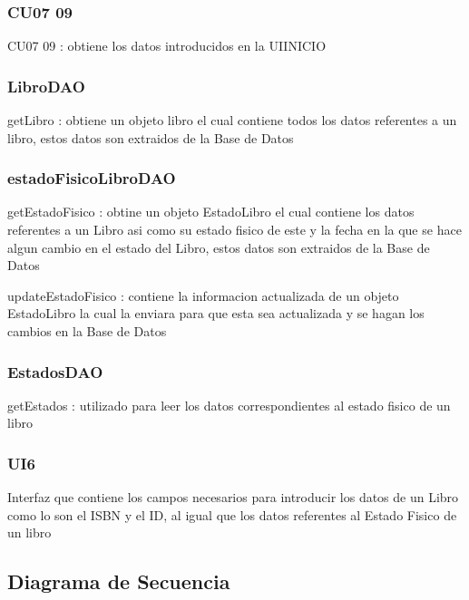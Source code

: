\subsubsection{CU07 09}
	\begin{Citemize}
		\item CU07 09 : obtiene los datos introducidos en la UIINICIO
	\end{Citemize}

\subsubsection{LibroDAO}
	\begin{Citemize}
		\item getLibro : obtiene un objeto libro el cual contiene todos los datos referentes a un libro, estos datos son extraidos de la Base de Datos
	\end{Citemize}
	
\subsubsection{estadoFisicoLibroDAO}
	\begin{Citemize}
		\item getEstadoFisico : obtine un objeto EstadoLibro el cual contiene los datos referentes a un Libro asi como su estado fisico de este y la fecha en la que se hace algun cambio en el estado del Libro, estos datos son extraidos de la Base de Datos
		\item updateEstadoFisico : contiene la informacion actualizada de un objeto EstadoLibro la cual la enviara para que esta sea actualizada y se hagan los cambios en la Base de Datos
	\end{Citemize}

\subsubsection{EstadosDAO}
	\begin{Citemize}
		\item getEstados : utilizado para leer los datos correspondientes al estado fisico de un libro
	\end{Citemize}
	
\subsubsection{UI6}
	\begin{Citemize}
		\item Interfaz que contiene los campos necesarios para introducir los datos de un Libro como lo son el ISBN y el ID, al igual que los datos referentes al Estado Fisico de un libro
	\end{Citemize}
	
\subsection{Diagrama de Secuencia}

